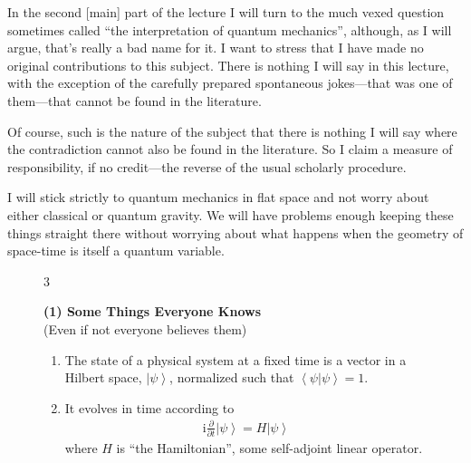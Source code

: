 \documentclass[twocolumn,prb]{revtex4}
\newcommand{\braket}[2]{\left\langle #1 | #2 \right\rangle}
\newcommand{\ket}[1]{\left|#1\right\rangle}
\renewcommand{\i}{\text{i}}
\begin{document}
In the second [main] part of the lecture I will turn to the much vexed question sometimes called ``the interpretation of quantum mechanics'', although, as I will argue, that's really a bad name for it. I want to stress that I have made no original contributions to this subject. There is nothing I will say in this lecture, with the exception of the carefully prepared spontaneous jokes---that was one of them---that cannot be found in the literature.

Of course, such is the nature of the subject that there is nothing I will say where the contradiction cannot also be found in the literature. So I claim a measure of responsibility, if no credit---the reverse of the usual scholarly procedure.

I will stick strictly to quantum mechanics in flat space and not worry about either classical or quantum gravity. We will have problems enough keeping these things straight there without worrying about what happens when the geometry of space-time is itself a quantum variable.

\begin{figure}[htb] 
\begin{mdframed}
  \vspace{5pt}\hfill 3\\[-18pt]
  \begin{center}
    \textbf{(1) Some Things Everyone Knows}\\[4pt]
    (Even if not everyone believes them)
  \end{center}
  \begin{enumerate}[label=(\roman*)]
  \item The state of a physical system at a fixed time is a vector in a Hilbert space, $\ket{\psi}$, normalized such that $\braket{\psi}{\psi}=1$.
  \item It evolves in time according to
    \begin{align}
      \nonumber
      \i\frac{\partial}{\partial t}\ket{\psi} = H\ket{\psi}
    \end{align}
    where $H$ is ``the Hamiltonian'', some self-adjoint linear operator.
  \end{enumerate}
  \vspace{6pt}
\end{mdframed}
\end{figure}
\end{document}
